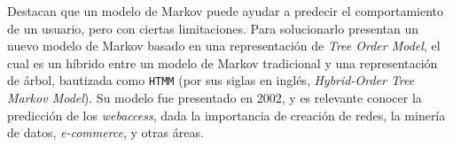 Destacan que un modelo de Markov puede ayudar a predecir el comportamiento de un usuario, pero con ciertas limitaciones. Para solucionarlo presentan un nuevo modelo de Markov basado en una representación de \emph{Tree Order Model}, el cual es un híbrido entre un modelo de Markov tradicional y una representación de árbol, bautizada como \texttt{HTMM} (por sus siglas en inglés, \emph{Hybrid-Order Tree Markov Model}).
Su modelo fue presentado en 2002, y es relevante conocer la predicción de los \emph{webaccess}, dada la importancia de creación de redes, la minería de datos, \emph{e-commerce}, y otras áreas.
